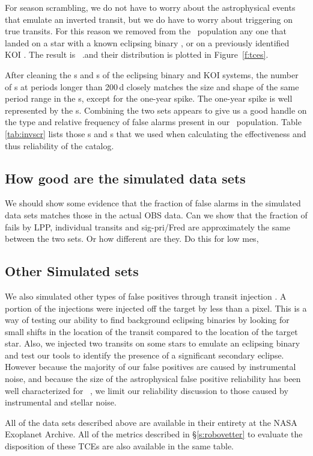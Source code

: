 For season scrambling, we do not have to worry about the astrophysical events that emulate an inverted transit, but we do have to worry about triggering on true transits. For this reason we removed from the \scrtce\ population any one that landed on a star with a known eclipsing binary \citep{Kirk2016}, or on a previously identified KOI \citep{Coughlin2016}.  The result is \nscrtces\ \scrtce.and their distribution is plotted in Figure~\ref{f:tces}. 

After cleaning the \invtce s and \scrtce s of the eclipsing binary and KOI systems, the number of \scrtce s at periods longer than 200\,d closely matches the size and shape of the same period range in the \opstce s, except for the one-year spike.  The one-year spike is well represented by the \invtce s.  Combining the two sets appears to give us a good handle on the type and relative frequency of false alarms present in our \opstce\ population. Table\,\ref{tab:invscr} lists those \invtce s and \sctce s that we used when calculating the effectiveness and thus reliability of the catalog.

\subsection{How good are the simulated data sets}
We should show some evidence that the fraction of false alarms in the simulated data sets matches those in the actual OBS data.  Can we show that the fraction of fails by LPP, individual transits and sig-pri/Fred are approximately the same between the two sets.  Or how different are they.  Do this for low mes,


\subsection{Other Simulated sets}
We also simulated other types of false positives through transit injection \citep{Christiansen2017}. A portion of the injections were injected off the target by less than a pixel.  This is a way of testing our ability to find background eclipsing binaries by looking for small shifts in the location of the transit compared to the location of the target star.  Also, we injected two transits on some stars to emulate an eclipsing binary and test our tools to identify the presence of a significant secondary eclipse.  However because the majority of our false positives are caused by instrumental noise, and because the size of the astrophysical false positive reliability has been well characterized for \Kepler\ \citep[e.g.][]{Morton2016}, we limit our reliability discussion to those caused by instrumental and stellar noise. 


All of the data sets described above are available in their entirety at the NASA Exoplanet Archive.  All of the metrics described in \S\ref{s:robovetter} to evaluate the disposition of these TCEs are also available in the same table. 